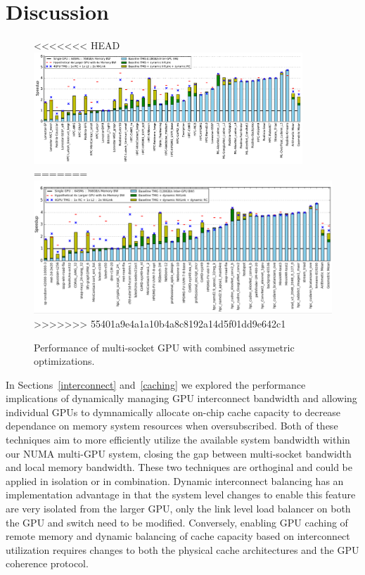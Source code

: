 \section {Discussion}

\label{discussion}
\begin{figure}[tp]
    \centering
<<<<<<< HEAD
    \includegraphics[width=0.9\textwidth]{figures/plot_final_speedup_WB_nvlink_first.pdf}
=======
    \includegraphics[width=1.0\textwidth]{figures/resultscombined.jpg}
>>>>>>> 55401a9e4a1a10b4a8c8192a14d5f01dd9e642c1
    \caption{Performance of multi-socket GPU with combined assymetric 
optimizations.}
    \label{fig:combined}
\end{figure}

In Sections~\ref{interconnect} and~\ref{caching} we explored the performance 
implications of dynamically managing GPU interconnect bandwidth and allowing 
individual GPUs to dymnamically allocate on-chip cache capacity to decrease 
dependance on memory system resources when oversubscribed.  Both of these 
techniques aim to more efficiently utilize the available system bandwidth within 
our NUMA multi-GPU system, closing the gap between multi-socket bandwidth and 
local memory bandwidth.  These two techniques are orthoginal and could be 
applied in isolation or in combination.  Dynamic interconnect balancing has an 
implementation advantage in that the system level changes to enable this feature 
are very isolated from the larger GPU, only the link level load balancer on both 
the GPU and switch need to be modified.  Conversely, enabling GPU caching of 
remote memory and dynamic balancing of cache capacity based on interconnect 
utilization requires changes to both the physical cache architectures and the 
GPU coherence protocol.

